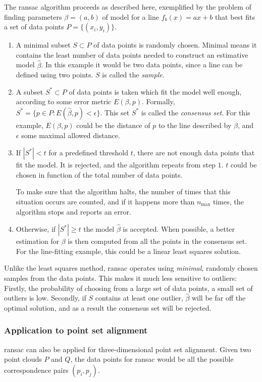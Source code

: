 The \gls{ransac} algorithm proceeds as described here, exemplified by the problem of finding parameters $\beta = (a, b)$ of model for a line $f_b(x) = ax + b$ that best fits a set of data points $P = \{ (x_i, y_i) \}$.
\begin{enumerate}
\item A minimal subset $S \subset P$ of data points is randomly chosen. Minimal means it contains the least number of data points needed to construct an estimative model $\hat{\beta}$. In this example it would be two data points, since a line can be defined using two points. $S$ is called the \emph{sample}.
\item A subset $S^{*} \subset P$ of data points is taken which fit the model well enough, according to some error metric $E(\beta, p)$. Formally, $S^{*} = \{ p \in P : E(\hat{\beta}, p) < \epsilon \}$. This set $S^{*}$ is called the \emph{consensus set}. For this example, $E(\beta, p)$ could be the distance of $p$ to the line described by $\beta$, and $\epsilon$ some maximal allowed distance.
\item If $|S^{*}| < t$ for a predefined threshold $t$, there are not enough data points that fit the model. It is rejected, and the algorithm repeats from step $1$. $t$ could be chosen in function of the total number of data points.

To make sure that the algorithm halts, the number of times that this situation occurs are counted, and if it happens more than $n_{\text{max}}$ times, the algorithm stops and reports an error.
\item Otherwise, if $|S^{*}| \geq t$ the model $\hat{\beta}$ is accepted. When possible, a better estimation for $\beta$ is then computed from all the points in the consensus set. For the line-fitting example, this could be a linear least squares solution.
\end{enumerate}

Unlike the least squares method, \gls{ransac} operates using \emph{minimal}, randomly chosen samples from the data points. This makes it much less sensitive to outliers: Firstly, the probability of choosing from a large set of data points, a small set of outliers is low. Secondly, if $S$ contains at least one outlier, $\hat{\beta}$ will be far off the optimal solution, and as a result the consensus set will be rejected.

\subsubsection{Application to point set alignment} \label{sec:ransac_pc}
\gls{ransac} can also be applied for three-dimensional point set alignment. Given two point clouds $P$ and $Q$, the data points for \gls{ransac} would be all the possible correspondence pairs $(p_i, p_j)$.


